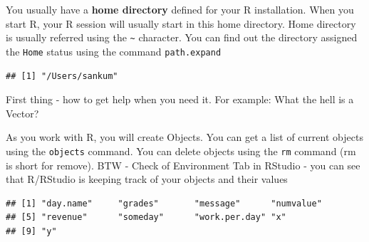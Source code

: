\documentclass[10pt, letterpaper, twoside]{memoir}\usepackage{knitr}
\begin{document}
You usually have a \textbf{home directory} defined for your R installation. When you start R, your R session will usually start in this home directory. Home directory is usually referred using the \verb|~| character. You can find out the directory assigned the \texttt{Home} status using the command \texttt{path.expand}
\begin{knitrout}
\color{fgcolor}\begin{kframe}
\begin{alltt}
\hlstd{(}\hlstd{)}
\end{alltt}
\begin{verbatim}
## [1] "/Users/sankum"
\end{verbatim}
\end{kframe}
\end{knitrout}

First thing - how to get help when you need it. For example: What the hell is a Vector?
\begin{knitrout}
\color{fgcolor}\begin{kframe}
\begin{alltt}
\hlstd{(}\hlstd{)}  
\hlstd{(}  
\hlstd{)}
\hlstd{(}\hlstd{)}  
\end{alltt}
\end{kframe}
\end{knitrout}

As you work with R, you will create Objects. You can get a list of current objects using the \texttt{objects} command. You can delete objects using the \texttt{rm} command (rm is short for remove). BTW - Check of Environment Tab in RStudio - you can see that R/RStudio is keeping track of your objects and their values

\begin{knitrout}
\color{fgcolor}\begin{kframe}
\begin{alltt}
\hlstd{()}
\end{alltt}
\begin{verbatim}
## [1] "day.name"     "grades"       "message"      "numvalue"    
## [5] "revenue"      "someday"      "work.per.day" "x"           
## [9] "y"
\end{verbatim}
\begin{alltt}
\hlstd{(} \hlstd{=} \hlstd{())}  
\end{alltt}
\end{kframe}
\end{knitrout}
\end{document}
